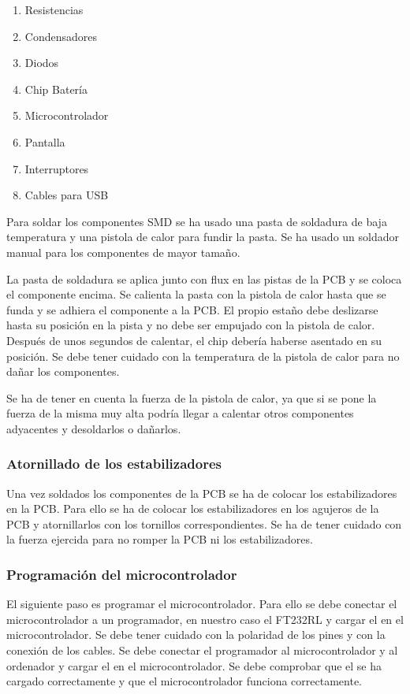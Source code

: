 \begin{enumerate}
    \item Resistencias
    \item Condensadores
    \item Diodos
    \item Chip Batería
    \item Microcontrolador
    \item Pantalla
    \item Interruptores
    \item Cables para \gls{USB}
\end{enumerate}

Para soldar los componentes \gls{SMD} se ha usado una pasta de soldadura de baja temperatura y una pistola de calor para fundir la pasta. Se ha usado un soldador manual para los componentes de mayor tamaño.

La pasta de soldadura se aplica junto con flux en las pistas de la \gls{PCB} y se coloca el componente encima. Se calienta la pasta con la pistola de calor hasta que se funda y se adhiera el componente a la \gls{PCB}. El propio estaño debe deslizarse hasta su posición en la pista y no debe ser empujado con la pistola de calor. Después de unos segundos de calentar, el chip debería haberse asentado en su posición. Se debe tener cuidado con la temperatura de la pistola de calor para no dañar los componentes.

Se ha de tener en cuenta la fuerza de la pistola de calor, ya que si se pone la fuerza de la misma muy alta podría llegar a calentar otros componentes adyacentes y desoldarlos o dañarlos. \cite{SoldaduraSMD}

\subsubsection{Atornillado de los estabilizadores}
Una vez soldados los componentes de la \gls{PCB} se ha de colocar los estabilizadores en la \gls{PCB}. Para ello se ha de colocar los estabilizadores en los agujeros de la \gls{PCB} y atornillarlos con los tornillos correspondientes. Se ha de tener cuidado con la fuerza ejercida para no romper la \gls{PCB} ni los estabilizadores.

\subsubsection{Programación del microcontrolador}
El siguiente paso es programar el microcontrolador. Para ello se debe conectar el microcontrolador a un programador, en nuestro caso el FT232RL y cargar el  en el microcontrolador. Se debe tener cuidado con la polaridad de los pines y con la conexión de los cables. Se debe conectar el programador al microcontrolador y al ordenador y cargar el  en el microcontrolador. Se debe comprobar que el  se ha cargado correctamente y que el microcontrolador funciona correctamente.


